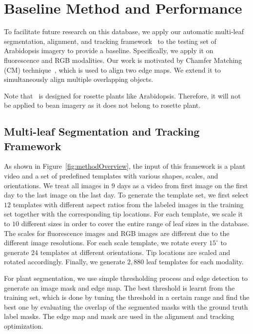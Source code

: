 \section{Baseline Method and Performance}
\label{sec:baseline}

To facilitate future research on this database, we apply our automatic multi-leaf segmentation, alignment, and tracking framework~\cite{yin2014a,yin2014b} to the testing set of Arabidopsis imagery to provide a baseline.
Specifically, we apply it on fluorescence and RGB modalities.
Our work is motivated by Chamfer Matching (CM) technique~\cite{barrow1977parametric}, which is used to align two edge maps.
We extend it to simultaneously align multiple overlapping objects.

Note that~\cite{yin2014a,yin2014b} is designed for rosette plants like Arabidopsis.
Therefore, it will not be applied to bean imagery as it does not belong to rosette plant.

\subsection{Multi-leaf Segmentation and Tracking Framework}
As shown in Figure~\ref{fig:methodOverview}, the input of this framework is a plant video and a set of predefined templates with various shapes, scales, and orientations.
We treat all images in $9$ days as a video from first image on the first day to the last image on the last day.
To generate the template set, we first select $12$ templates with different aspect ratios from the labeled images in the training set together with the corresponding tip locations.
For each template, we scale it to $10$ different sizes in order to cover the entire range of leaf sizes in the database.
The scales for fluorescence images and RGB images are different due to the different image resolutions.
For each scale template, we rotate every $15^{\circ}$ to generate $24$ templates at different orientations.
Tip locations are scaled and rotated accordingly.
Finally, we generate $2,880$ leaf templates for each modality.


For plant segmentation, we use simple thresholding process and edge detection to generate an image mask and edge map.
The best threshold is learnt from the training set, which is done by tuning the threshold in a certain range and find the best one by evaluating the overlap of the segmented masks with the ground truth label masks.
The edge map and mask are used in the alignment and tracking optimization.

